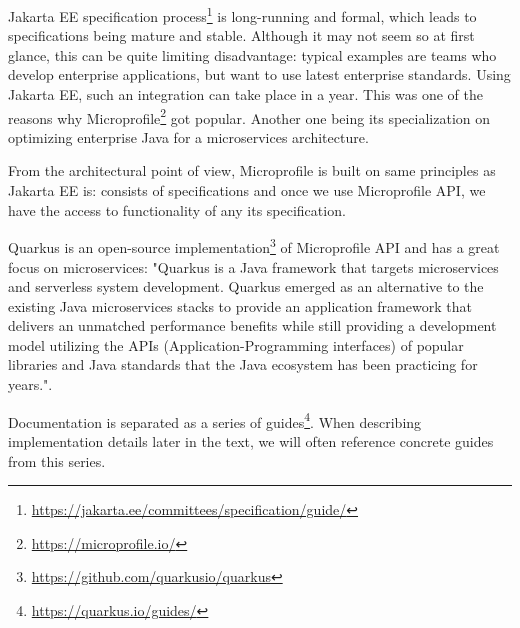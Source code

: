 \documentclass[../main.tex]{subfiles}
\begin{document}
Jakarta EE specification process\footnote{\url{https://jakarta.ee/committees/specification/guide/}} is long-running and formal, which leads to specifications being mature and stable. Although it may not seem so at first glance, this can be quite limiting disadvantage: typical examples are teams who develop enterprise applications, but want to use latest enterprise standards. Using Jakarta EE, such an integration can take place in a year. This was one of the reasons why Microprofile\footnote{\url{https://microprofile.io/}} got popular. Another one being its specialization on optimizing enterprise Java for a microservices architecture.

From the architectural point of view, Microprofile is built on same principles as Jakarta EE is: consists of specifications and once we use Microprofile API, we have the access to functionality of any its specification.

Quarkus is an open-source implementation\footnote{\url{https://github.com/quarkusio/quarkus}} of Microprofile API and has a great focus on microservices: "Quarkus is a Java framework that targets microservices and serverless system
development. Quarkus emerged as an alternative to the existing Java
microservices stacks to provide an application framework that delivers an
unmatched performance benefits while still providing a development model
utilizing the APIs (Application-Programming interfaces) of popular libraries
and Java standards that the Java ecosystem has been practicing for years."\cite{quarkusinaction}\cite{quarkusBook}.

Documentation is separated as a series of guides\footnote{\url{https://quarkus.io/guides/}}. When describing implementation details later in the text, we will often reference concrete guides from this series.
\end{document}
